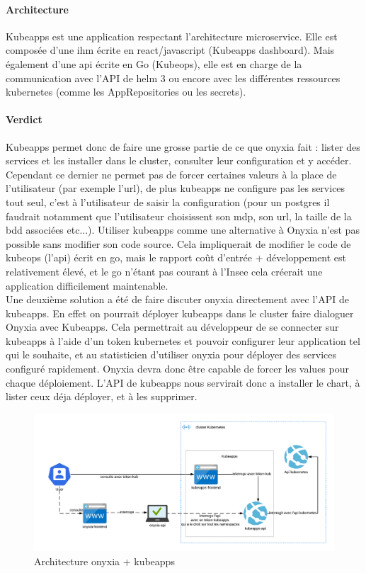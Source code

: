 \documentclass[11pt,fleqn]{book} %
\begin{document}
\paragraph{Architecture}
Kubeapps est une application respectant l'architecture microservice. Elle est composée d'une ihm écrite en react/javascript (Kubeapps dashboard). Mais également d'une api écrite en Go (Kubeops), elle est en charge de la communication avec l'API de helm 3 ou encore avec les différentes ressources kubernetes (comme les AppRepositories ou les secrets).\\

\paragraph{Verdict}
Kubeapps permet donc de faire une grosse partie de ce que onyxia fait : lister des services et les installer dans le cluster, consulter leur configuration et y accéder. Cependant ce dernier ne permet pas de forcer certaines valeurs à la place de l'utilisateur (par exemple l'url),  de plus kubeapps ne configure pas les services tout seul, c'est à l'utilisateur de saisir la configuration (pour un postgres il faudrait notamment que l'utilisateur choisissent son mdp, son url, la taille de la bdd associées etc...). Utiliser kubeapps comme une alternative à Onyxia n'est pas possible sans modifier son code source. Cela impliquerait de modifier le code de kubeops (l'api) écrit en go, mais le rapport coût d'entrée + développement est relativement élevé, et le go n'étant pas courant à l'Insee cela créerait une application difficilement maintenable.\\

Une deuxième solution a été de faire discuter onyxia directement avec l'API de kubeapps. En effet on pourrait déployer kubeapps dans le cluster faire dialoguer Onyxia avec Kubeapps. Cela permettrait au développeur de se connecter sur kubeapps à l'aide d'un token kubernetes et pouvoir configurer leur application tel qui le souhaite, et au statisticien d'utiliser onyxia pour déployer des services configuré rapidement. Onyxia devra donc être capable de forcer les values pour chaque déploiement. L'API de kubeapps nous servirait donc a installer le chart, à lister ceux déja déployer, et à les supprimer. 
\begin{figure}[H]
\renewcommand{\figurename}{Graphique}
\hspace{-3cm}
\includegraphics[scale=0.8]{Pictures/onyxia/kubeapps.png}
\captionsetup{margin=1.5cm,format=hang,justification=justified}
\caption[]{Architecture onyxia + kubeapps \newline}
\end{figure}
\end{document}

